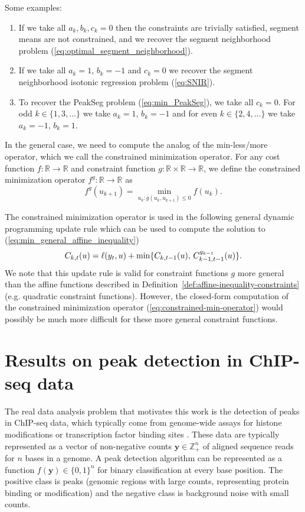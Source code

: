 \documentclass{article}
\newcommand{\ZZ}{\mathbb Z}
\newcommand{\RR}{\mathbb R}
\begin{document}
Some examples:
\begin{enumerate}
\item If we take all $a_k,b_k,c_k=0$ then the constraints are
  trivially satisfied, segment means are not constrained, and we
  recover the segment neighborhood problem
  (\ref{eq:optimal_segment_neighborhood}).
\item If we take all $a_{k} =1$, $b_{k}=-1$ and $c_{k} = 0$ we
  recover the segment neighborhood isotonic regression problem (\ref{eq:SNIR}).
\item To recover the PeakSeg problem (\ref{eq:min_PeakSeg}),
  we take all $c_{k} = 0$. For odd $k\in\{1,3,\dots\}$ we take
  $a_{k} =1$, $b_{k}=-1$ and for even $k\in\{2,4,\dots\}$ we take
  $a_{k} =-1$, $b_{k}=1$.
\end{enumerate}

In the general case, we need to compute the analog of the
min-less/more operator, which we call the constrained minimization
operator. For any cost function $f:\RR\rightarrow\RR$ and constraint
function $g:\RR\times\RR\rightarrow\RR$, we define the constrained
minimization operator $f^g:\RR\rightarrow\RR$ as
\begin{equation}
  \label{eq:constrained-min-operator}
  f^g(u_{k+1}) = \min_{u_k : g(u_k, u_{k+1})\leq 0} f(u_k).
\end{equation}

The constrained minimization operator is used in the following general
dynamic programming update rule which can be used to compute the solution to (\ref{eq:min_general_affine_inequality})
\begin{equation}
  \label{eq:general_dp}
  C_{k,t}(u) = \ell(y_t,u) + \min\{
  C_{k,t-1}(u),\,
  C_{k-1,t-1}^{g_{k-1}}(u)
  \}.
\end{equation}
We note that this update rule is valid for constraint functions $g$
more general than the affine functions described in
Definition~\ref{def:affine-inequality-constraints} (e.g. quadratic
constraint functions). However, the closed-form computation of the
constrained minimization operator (\ref{eq:constrained-min-operator})
would possibly be much more difficult for these more general constraint functions. 

\section{Results on peak detection in ChIP-seq data}
\label{sec:results-chip-seq}

The real data analysis problem that motivates this work is the
detection of peaks in ChIP-seq data, which typically come from
genome-wide assays for histone modifications or transcription factor
binding sites \citep{practical}. These data are typically represented
as a vector of non-negative counts $\mathbf y\in\ZZ_+^n$ of aligned
sequence reads for $n$ bases in a genome. A peak detection algorithm
can be represented as a function $f(\mathbf y)\in\{0,1\}^n$ for binary
classification at every base position. The positive class is peaks
(genomic regions with large counts, representing protein binding or
modification) and the negative class is background noise with small
counts.
\end{document}
